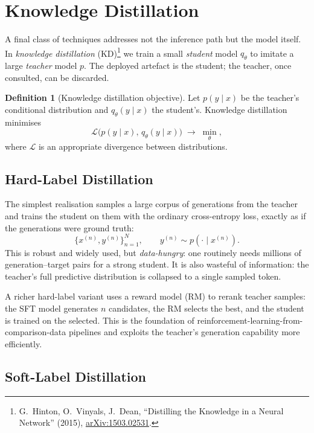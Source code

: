 \documentclass[11pt,a4paper]{article}
\theoremstyle{definition}
\newtheorem{definition}{Definition}[section]
\theoremstyle{remark}
\theoremstyle{plain}
\newcommand{\arxivlink}[1]{\href{https://arxiv.org/abs/#1}{arXiv:#1}}
\begin{document}
\section{Knowledge Distillation}
\label{sec:kd}

A final class of techniques addresses not the inference path but the model
itself. In \emph{knowledge distillation} (KD)\footnote{G.\ Hinton,
O.\ Vinyals, J.\ Dean, ``Distilling the Knowledge in a Neural Network''
(2015), \arxivlink{1503.02531}.} we train a small \emph{student} model
$q_\theta$ to imitate a large \emph{teacher} model $p$. The deployed
artefact is the student; the teacher, once consulted, can be discarded.

\begin{definition}[Knowledge distillation objective]
Let $p(y \mid x)$ be the teacher's conditional distribution and
$q_\theta(y\mid x)$ the student's. Knowledge distillation minimises
\[
  \mathcal{L}\bigl(p(y\mid x),\, q_\theta(y\mid x)\bigr) \;\longrightarrow\; \min_\theta,
\]
where $\mathcal{L}$ is an appropriate divergence between distributions.
\end{definition}

\subsection{Hard-Label Distillation}

The simplest realisation samples a large corpus of generations from the
teacher and trains the student on them with the ordinary cross-entropy
loss, exactly as if the generations were ground truth:
\[
  \{x^{(n)}, y^{(n)}\}_{n=1}^N, \qquad y^{(n)} \sim p(\cdot \mid x^{(n)}).
\]
This is robust and widely used, but \emph{data-hungry}: one routinely
needs millions of generation--target pairs for a strong student. It is also
wasteful of information: the teacher's full predictive distribution is
collapsed to a single sampled token.

A richer hard-label variant uses a reward model (RM) to rerank teacher
samples: the SFT model generates $n$ candidates, the RM selects the best,
and the student is trained on the selected. This is the foundation of
reinforcement-learning-from-comparison-data pipelines and exploits the
teacher's generation capability more efficiently.

\subsection{Soft-Label Distillation}
\end{document}
